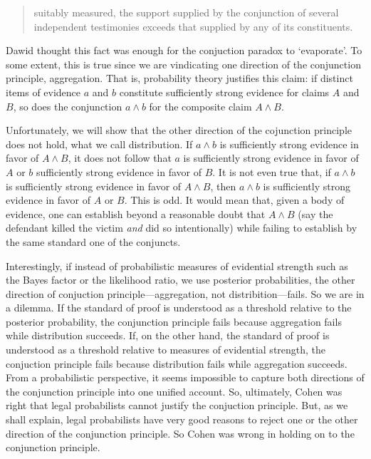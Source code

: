 \documentclass[10pt,dvipsnames,enabledeprecatedfontcommands]{scrartcl}
\begin{document}
\begin{quote} suitably measured, the support  supplied by the conjunction of several independent testimonies exceeds that supplied by any of its constituents.
 \end{quote}

\noindent
Dawid thought this fact was enough for the conjuction paradox to
`evaporate'. To some extent, this is true since we are vindicating one
direction of the conjunction principle, aggregation. That is,
probability theory justifies this claim: if distinct items of evidence
\(a\) and \(b\) constitute sufficiently strong evidence for claims \(A\)
and \(B\), so does the conjunction \(a\wedge b\) for the composite claim
\(A\wedge B\).

Unfortunately, we will show that the other direction of the cojunction
principle does not hold, what we call distribution. If \(a \wedge b\) is
sufficiently strong evidence in favor of \(A \wedge B\), it does not
follow that \(a\) is sufficiently strong evidence in favor of \(A\) or
\(b\) sufficiently strong evidence in favor of \(B\). It is not even
true that, if \(a \wedge b\) is sufficiently strong evidence in favor of
\(A \wedge B\), then \(a\wedge b\) is sufficiently strong evidence in
favor of \(A\) or \(B\). This is odd. It would mean that, given a body
of evidence, one can establish beyond a reasonable doubt that
\(A \wedge B\) (say the defendant killed the victim \textit{and} did so
intentionally) while failing to establish by the same standard one of
the conjuncts.

Interestingly, if instead of probabilistic measures of evidential
strength such as the Bayes factor or the likelihood ratio, we use
posterior probabilities, the other direction of conjuction
principle---aggregation, not distribition---fails. So we are in a
dilemma. If the standard of proof is understood as a threshold relative
to the posterior probability, the conjunction principle fails because
aggregation fails while distribution succeeds. If, on the other hand,
the standard of proof is understood as a threshold relative to measures
of evidential strength, the conjuction principle fails because
distribution fails while aggregation succeeds. From a probabilistic
perspective, it seems impossible to capture both directions of the
conjunction principle into one unified account. So, ultimately, Cohen
was right that legal probabilists cannot justify the conjuction
principle. But, as we shall explain, legal probabilists have very good
reasons to reject one or the other direction of the conjunction
principle. So Cohen was wrong in holding on to the conjunction
principle.
\end{document}
